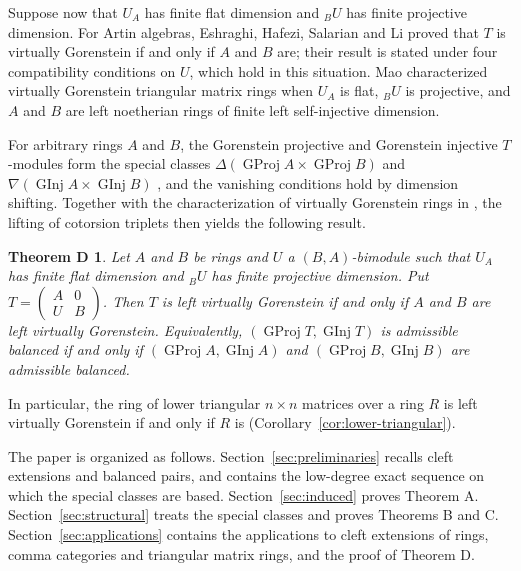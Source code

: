 \documentclass[11pt]{amsart}
\theoremstyle{definition}
\theoremstyle{remark}
\theoremstyle{plain}
\newtheorem*{theoremD}{Theorem D}
\numberwithin{equation}{section}
\begin{document}
Suppose now that $U_A$ has finite flat dimension and ${}_BU$ has finite
projective dimension. For Artin algebras, Eshraghi, Hafezi, Salarian and Li
\cite[Proposition~3.3]{EHSL} proved that $T$ is virtually Gorenstein if and
only if $A$ and $B$ are; their result is stated under four compatibility
conditions on $U$, which hold in this situation.
Mao \cite[Theorem~2.8]{Mao} characterized virtually Gorenstein triangular
matrix rings when $U_A$ is flat, ${}_BU$ is projective, and $A$ and $B$
are left noetherian rings of finite left self-injective dimension.

For arbitrary rings $A$ and $B$, the Gorenstein projective and Gorenstein injective
$T$-modules form the special classes
$\Delta(\operatorname{GProj} A \times \operatorname{GProj} B)$ and
$\nabla(\operatorname{GInj} A \times \operatorname{GInj} B)$ \cite{LiZhengHuZhu,YuanHeWu}, and
the vanishing conditions hold by dimension shifting. Together with the
characterization of virtually Gorenstein rings in \cite{EHT}, the lifting
of cotorsion triplets then yields the following result.

\begin{theoremD}
Let $A$ and $B$ be rings and $U$ a $(B, A)$-bimodule such that $U_A$ has
finite flat dimension and ${}_BU$ has finite projective dimension. Put
$T = \left(\begin{smallmatrix}A & 0\\ U & B\end{smallmatrix}\right)$. Then $T$
is left virtually Gorenstein if and only if $A$ and $B$ are left
virtually Gorenstein. Equivalently, $(\operatorname{GProj} T, \operatorname{GInj} T)$ is admissible
balanced if and only if $(\operatorname{GProj} A, \operatorname{GInj} A)$ and $(\operatorname{GProj} B, \operatorname{GInj} B)$ are
admissible balanced.
\end{theoremD}

In particular, the ring of lower triangular $n \times n$ matrices over a
ring $R$ is left virtually Gorenstein if and only if $R$ is
(Corollary~\ref{cor:lower-triangular}).

The paper is organized as follows. Section~\ref{sec:preliminaries}
recalls cleft extensions and balanced pairs, and contains the low-degree
exact sequence on which the special classes are based.
Section~\ref{sec:induced} proves Theorem A. Section~\ref{sec:structural}
treats the special classes and proves Theorems B and C. Section~\ref{sec:applications} contains the applications to
cleft extensions of rings, comma categories and triangular matrix rings,
and the proof of Theorem D.
\end{document}
